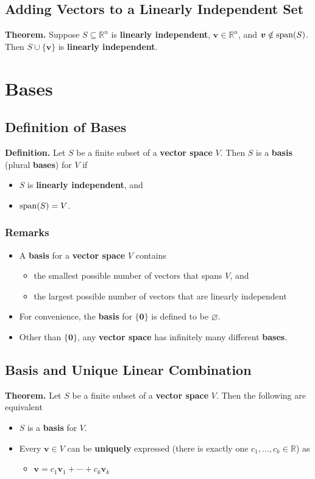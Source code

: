 \documentclass[../ma2001_notes.tex]{subfiles}
\begin{document}
\subsection{Adding Vectors to a Linearly Independent Set}
\textbf{Theorem.} Suppose \(S\subseteq\mathbb{R}^n\) is \textbf{linearly independent}, \(\bm{v}\in\mathbb{R}^n\), and \(\bm{v}\notin\operatorname{span}(S)\). Then \(S\cup\{\bm{v}\}\) is \textbf{linearly independent}.

\section{Bases}
\subsection{Definition of Bases}
\textbf{Definition.} Let \(S\) be a finite subset of a \textbf{vector space} \(V\). Then \(S\) is a \textbf{basis} (plural \textbf{bases}) for \(V\) if
\begin{itemize}
	\item\(S\) is \textbf{linearly independent}, and
	\item\(\operatorname{span}(S)=V\).
\end{itemize}

\subsubsection{Remarks}
\begin{itemize}
	\item A \textbf{basis} for a \textbf{vector space} \(V\) contains
	\begin{itemize}
		\item the smallest possible number of vectors that spans \(V\), and
		\item the largest possible number of vectors that are linearly independent
	\end{itemize}
	\item For convenience, the \textbf{basis} for \(\{\bm{0}\}\) is defined to be \(\varnothing\).
	\item Other than \(\{\bm{0}\}\), any \textbf{vector space} has infinitely many different \textbf{bases}.
\end{itemize}

\subsection{Basis and Unique Linear Combination}
\textbf{Theorem.} Let \(S\) be a finite subset of a \textbf{vector space} \(V\). Then the following are equivalent
\begin{itemize}
	\item\(S\) is a \textbf{basis} for \(V\).
	\item Every \(\bm{v}\in V\) can be \textbf{uniquely} expressed (there is exactly one \(c_1,\ldots,c_k\in\mathbb{R}\)) as
	\begin{itemize}
		\item\(\bm{v}=c_1\bm{v}_1+\cdots+c_k\bm{v}_k\)
	\end{itemize}
\end{itemize}
\end{document}
